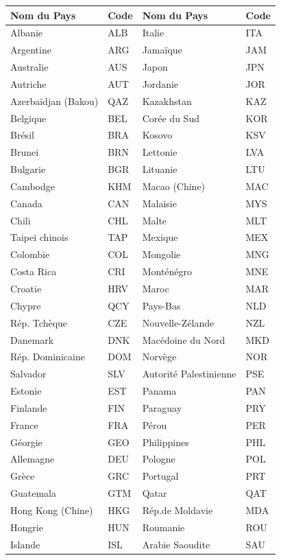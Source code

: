 \documentclass[
  french,
  11pt,
  a4paper,
  oneside]{report}
\newcounter{none} %
\begin{document}
{\def\LTcaptype{none} %
\begin{longtable}[]{@{}llll@{}}
\toprule\noalign{}
Nom du Pays & Code & Nom du Pays & Code \\
\midrule\noalign{}
\endhead
\bottomrule\noalign{}
\endlastfoot
Albanie & ALB & Italie & ITA \\
Argentine & ARG & Jamaïque & JAM \\
Australie & AUS & Japon & JPN \\
Autriche & AUT & Jordanie & JOR \\
Azerbaïdjan (Bakou) & QAZ & Kazakhstan & KAZ \\
Belgique & BEL & Corée du Sud & KOR \\
Brésil & BRA & Kosovo & KSV \\
Brunei & BRN & Lettonie & LVA \\
Bulgarie & BGR & Lituanie & LTU \\
Cambodge & KHM & Macao (Chine) & MAC \\
Canada & CAN & Malaisie & MYS \\
Chili & CHL & Malte & MLT \\
Taipei chinois & TAP & Mexique & MEX \\
Colombie & COL & Mongolie & MNG \\
Costa Rica & CRI & Monténégro & MNE \\
Croatie & HRV & Maroc & MAR \\
Chypre & QCY & Pays-Bas & NLD \\
Rép. Tchèque & CZE & Nouvelle-Zélande & NZL \\
Danemark & DNK & Macédoine du Nord & MKD \\
Rép. Dominicaine & DOM & Norvège & NOR \\
Salvador & SLV & Autorité Palestinienne & PSE \\
Estonie & EST & Panama & PAN \\
Finlande & FIN & Paraguay & PRY \\
France & FRA & Pérou & PER \\
Géorgie & GEO & Philippines & PHL \\
Allemagne & DEU & Pologne & POL \\
Grèce & GRC & Portugal & PRT \\
Guatemala & GTM & Qatar & QAT \\
Hong Kong (Chine) & HKG & Rép.de Moldavie & MDA \\
Hongrie & HUN & Roumanie & ROU \\
Islande & ISL & Arabie Saoudite & SAU \\

\end{longtable}}
\end{document}
